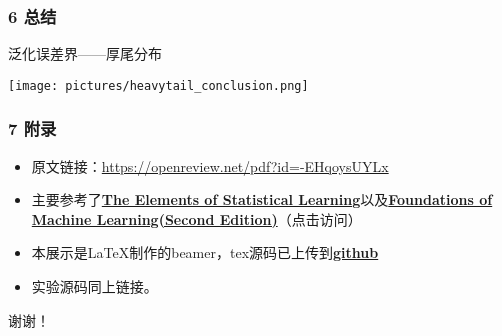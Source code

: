 \documentclass{beamer}
\begin{document}
\begin{frame}
    \frametitle{6 总结}
    \begin{exampleblock}{泛化误差界——厚尾分布}
        \begin{center}
            \texttt{[image: pictures/heavytail\_conclusion.png]}
        \end{center}
    \end{exampleblock}
\end{frame}
\begin{frame}
    \frametitle{7 附录}
    \begin{itemize}
        \item 原文链接：\url{https://openreview.net/pdf?id=-EHqoysUYLx}
        \item 主要参考了\href{https://link.springer.com/book/10.1007/978-0-387-84858-7}{\textbf{The Elements of Statistical Learning}}以及\href{https://cs.nyu.edu/~mohri/mlbook/}{\textbf{Foundations of Machine Learning(Second Edition)}}（点击访问）
        \item 本展示是\LaTeX{}制作的beamer，tex源码已上传到\href{https://github.com/Borel-Peng/ml-}{\textbf{github}}
        \item 实验源码同上链接。
    \end{itemize}
\end{frame}
\begin{frame}
    \begin{center}
        \Huge{谢谢！}
    \end{center}
\end{frame}
\end{document}
